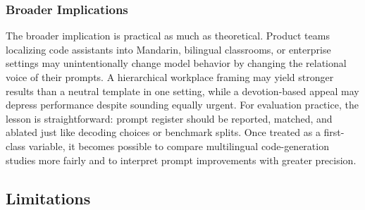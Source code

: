 \documentclass{article}
\begin{document}
\subsubsection{Broader Implications}

\label{sec:broader_implications}

The broader implication is practical as much as theoretical. Product teams localizing code assistants into Mandarin, bilingual classrooms, or enterprise settings may unintentionally change model behavior by changing the relational voice of their prompts. A hierarchical workplace framing may yield stronger results than a neutral template in one setting, while a devotion-based appeal may depress performance despite sounding equally urgent. For evaluation practice, the lesson is straightforward: prompt register should be reported, matched, and ablated just like decoding choices or benchmark splits. Once treated as a first-class variable, it becomes possible to compare multilingual code-generation studies more fairly and to interpret prompt improvements with greater precision.

\subsection{Limitations}

\label{sec:limitations}
\end{document}

